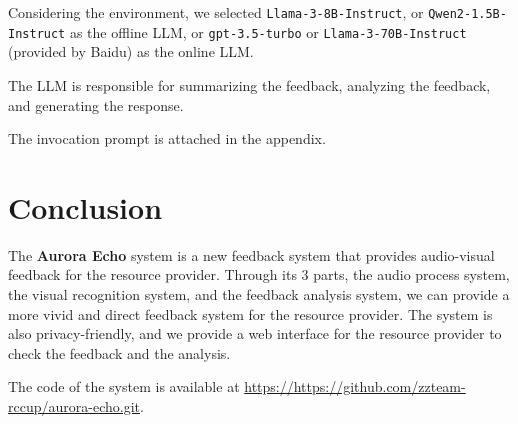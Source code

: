 \documentclass{article}
\begin{document}
    Considering the environment, we selected \texttt{Llama-3-8B-Instruct}\cite{llama3modelcard}, or \texttt{Qwen2-1.5B-Instruct}\cite{qwen2} as the offline LLM, or \texttt{gpt-3.5-turbo}\cite{gpt-3.5-turbo} or \texttt{Llama-3-70B-Instruct} (provided by Baidu)\cite{llama-3-70b-instruct} as the online LLM.

    The LLM is responsible for summarizing the feedback, analyzing the feedback, and generating the response.

    The invocation prompt is attached in the appendix.

    \section{Conclusion}\label{sec:conclusion}

    The \textbf{Aurora Echo} system is a new feedback system that provides audio-visual feedback for the resource provider.
    Through its 3 parts, the audio process system, the visual recognition system, and the feedback analysis system, we can provide a more vivid and direct feedback system for the resource provider.
    The system is also privacy-friendly, and we provide a web interface for the resource provider to check the feedback and the analysis.

    The code of the system is available at \url{https://https://github.com/zzteam-rccup/aurora-echo.git}.

    \nocite{*}
    
    
\end{document}
